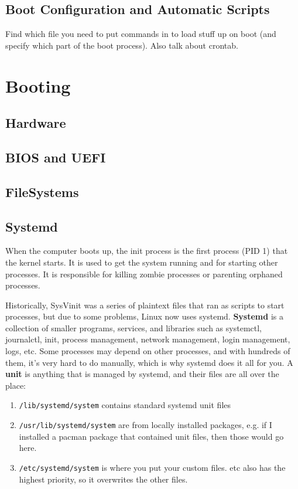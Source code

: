 \documentclass{article}
\begin{document}
  \subsection{Boot Configuration and Automatic Scripts}

    Find which file you need to put commands in to load stuff up on boot (and specify which part of the boot process). Also talk about crontab. 

\section{Booting}

  \subsection{Hardware}


  \subsection{BIOS and UEFI}


  \subsection{FileSystems}


  \subsection{Systemd}

    When the computer boots up, the init process is the first process (PID 1) that the kernel starts. It is used to get the system running and for starting other processes. It is responsible for killing zombie processes or parenting orphaned processes. 

    Historically, SysVinit was a series of plaintext files that ran as scripts to start processes, but due to some problems, Linux now uses systemd. \textbf{Systemd} is a collection of smaller programs, services, and libraries such as systemctl, journalctl, init, process management, network management, login management, logs, etc. Some processes may depend on other processes, and with hundreds of them, it's very hard to do manually, which is why systemd does it all for you. A \textbf{unit} is anything that is managed by systemd, and their files are all over the place: 
    
    \begin{enumerate}
      \item \texttt{/lib/systemd/system} contains standard systemd unit files 
      \item \texttt{/usr/lib/systemd/system} are from locally installed packages, e.g. if I installed a pacman package that contained unit files, then those would go here. 
      \item \texttt{/etc/systemd/system} is where you put your custom files. etc also has the highest priority, so it overwrites the other files.  
    \end{enumerate}
\end{document}
